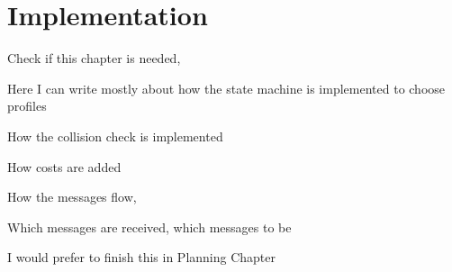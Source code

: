 \chapter{Implementation}
\label{implementation}
Check if this chapter is needed, 

Here I can write mostly about how the state machine is implemented to choose profiles

How the collision check is implemented

How costs are added

How the messages flow, 

Which messages are received, which messages to be 



I would prefer to finish this in Planning Chapter 